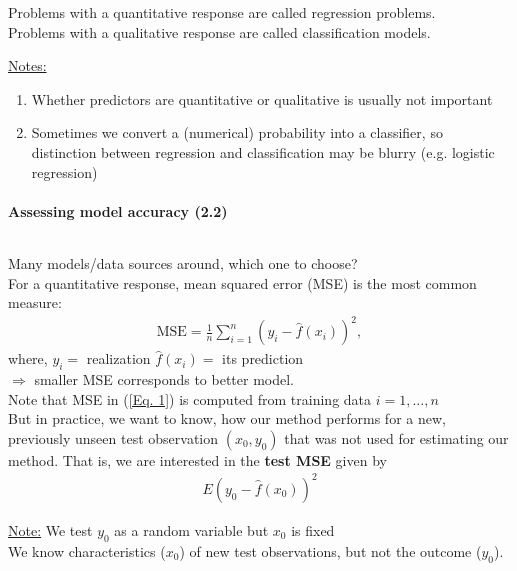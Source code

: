 \documentclass[11pt,a4paper,numbers=endperiod]{scrartcl}
\newcommand{\id}{\hspace*{4mm}}
\newcommand{\tit}[1]{\begin{large} \underline{\text{#1}}\end{large}}
\begin{document}
Problems with a quantitative response are called regression problems.\\
Problems with a qualitative response are called classification models.

\underline{Notes:} \begin{enumerate}
	\item Whether predictors are quantitative or qualitative is usually not important
	\item Sometimes we convert a (numerical) probability into a classifier, so distinction between regression and classification may be blurry (e.g. logistic regression)
\end{enumerate}

\paragraph{Assessing model accuracy (2.2)}
$ $\\

\tit{Question:} Many models/data sources around, which one to choose?\\

For a quantitative response, mean squared error (MSE) is the most common measure: \begin{align}
	\text{MSE} = \frac{1}{n} \sum\limits_{i = 1}^n (y_i - \hat{f}(x_i))^2, \label{Eq. 1}
\end{align}
where, $y_i =$ realization $\hat{f}(x_i) =$ its prediction\\
$\Rightarrow$ smaller MSE corresponds to better model.\\
Note that MSE in (\ref*{Eq. 1}) is computed from training data $i = 1, \ldots, n$\\
But in practice, we want to know, how our method performs for a new, previously unseen test observation $(x_0, y_0)$ that was not used for estimating our method. That is, we are interested in the \textbf{test MSE} given by \begin{align}
	E(y_0 - \hat{f}(x_0))^2 \label{Eq. 2}
\end{align}

\underline{Note:} We test $y_0$ as a random variable but $x_0$ is fixed\\
\id {} We know characteristics ($x_0$) of new test observations, but not the outcome ($y_0$). \\ 
\end{document}
